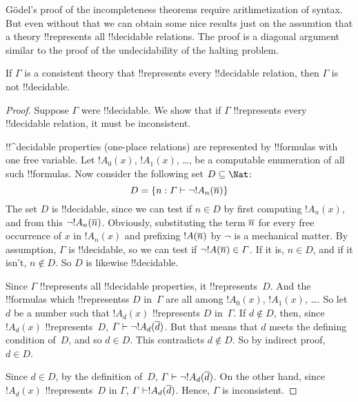 \documentclass[../../../include/open-logic-section]{subfiles}
\begin{document}


G\"odel's proof of the incompleteness theorems require arithmetization
of syntax. But even without that we can obtain some nice results just
on the assumtion that a theory !!{represents} all !!{decidable}
relations.  The proof is a diagonal argument similar to the proof of
the undecidability of the halting problem.

\begin{thm}
If $\Gamma$ is a consistent theory that !!{represents} every
!!{decidable} relation, then $\Gamma$ is not !!{decidable}.
\end{thm}

\begin{proof}
Suppose $\Gamma$ were !!{decidable}. We show that if $\Gamma$
!!{represents} every !!{decidable} relation, it must be inconsistent.

!!^{decidable} properties (one-place relations) are represented by
!!{formula}s with one free variable. Let $!A_0(x)$, $!A_1(x)$, \dots,
be a computable enumeration of all such !!{formula}s.  Now consider
the following set $D \subseteq \Nat$:
\[
D = \Setabs{n}{\Gamma \Proves \lnot !A_n(\num{n})}
\]
The set $D$ is !!{decidable}, since we can test if $n \in D$ by first
computing $!A_n(x)$, and from this $\lnot !A_n(\overline{n})$. Obviously,
substituting the term $\overline{n}$ for every free occurrence of $x$ in
$!A_n(x)$ and prefixing $!A(\overline{n})$ by $\lnot$ is a mechanical
matter.  By assumption, $\Gamma$ is !!{decidable}, so we can test if
$\lnot !A(\overline{n}) \in \Gamma$. If it is, $n \in D$, and if it isn't,
$n \notin D$. So $D$ is likewise !!{decidable}.

Since $\Gamma$ !!{represents} all !!{decidable} properties, it
!!{represents}~$D$.  And the !!{formula}s which !!{represents}s $D$
in~$\Gamma$ are all among $!A_0(x)$, $!A_1(x)$, \dots. So let $d$ be a
number such that $!A_d(x)$ !!{represents} $D$ in~$\Gamma$.  If $d
\notin D$, then, since $!A_d(x)$ !!{represents}~$D$, $\Gamma \Proves
\lnot !A_d(\num{d})$. But that means that $d$ meets the defining
condition of~$D$, and so $d \in D$. This contradicts $d \notin D$. So
by indirect proof, $d \in D$.

Since $d \in D$, by the definition of~$D$, $\Gamma \Proves \lnot
!A_d(\num{d})$. On the other hand, since $!A_d(x)$ !!{represents}~$D$
in $\Gamma$, $\Gamma \Proves !A_d(\num{d})$. Hence, $\Gamma$ is
inconsistent.
\end{proof}
\end{document}
